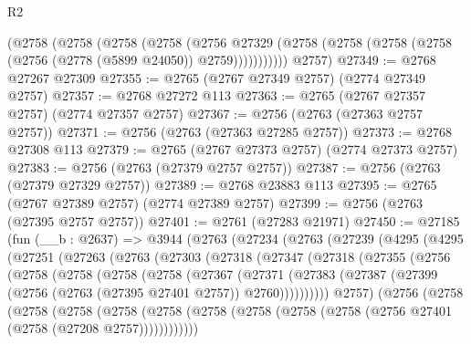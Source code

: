 \begin{lexlean}{R2}
\begin{coremodule}
        (@2758
          (@2758
            (@2758
              (@2758
                (@2756
                  @27329
                  (@2758 (@2758 (@2758 (@2758 (@2756 (@2778 (@5899 @24050)) @2759)))))))))))
      @2757)
@27349 := @2768 @27267 @27309
@27355 := @2765 (@2767 @27349 @2757) (@2774 @27349 @2757)
@27357 := @2768 @27272 @113
@27363 := @2765 (@2767 @27357 @2757) (@2774 @27357 @2757)
@27367 := @2756 (@2763 (@27363 @2757 @2757))
@27371 := @2756 (@2763 (@27363 @27285 @2757))
@27373 := @2768 @27308 @113
@27379 := @2765 (@2767 @27373 @2757) (@2774 @27373 @2757)
@27383 := @2756 (@2763 (@27379 @2757 @2757))
@27387 := @2756 (@2763 (@27379 @27329 @2757))
@27389 := @2768 @23883 @113
@27395 := @2765 (@2767 @27389 @2757) (@2774 @27389 @2757)
@27399 := @2756 (@2763 (@27395 @2757 @2757))
@27401 := @2761 (@27283 @21971)
@27450 := @27185
    (fun (__b : @2637) =>
    @3944
      (@2763
        (@27234
          (@2763
            (@27239
              (@4295
                (@4295
                  (@27251
                    (@27263
                      (@2763
                        (@27303
                          (@27318
                            (@27347
                              (@27318
                                (@27355
                                  (@2756
                                    (@2758
                                      (@2758
                                        (@2758
                                          (@2758
                                            (@27367
                                              (@27371
                                                (@27383
                                                  (@27387
                                                    (@27399
                                                      (@2756
                                                        (@2763 (@27395 @27401 @2757))
                                                        @2760))))))))))
                                    @2757)
                                  (@2756
                                    (@2758
                                      (@2758
                                        (@2758
                                          (@2758
                                            (@2758
                                              (@2758
                                                (@2758
                                                  (@2758
                                                    (@2758
                                                      (@2756 @27401 (@2758 (@27208 @2757))))))))))))

\end{coremodule}
\end{lexlean}
